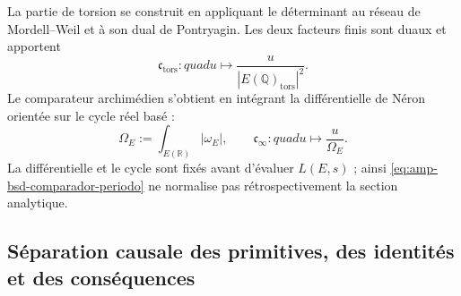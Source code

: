 La partie de torsion se construit en appliquant le déterminant au réseau de
Mordell--Weil et à son dual de Pontryagin. Les deux facteurs finis sont duaux et
apportent
\begin{equation}\label{eq:amp-bsd-comparador-torsion}
 \mathfrak c_{\mathrm{tors}}:quad
 u\longmapsto
 \frac{u}{|E(\mathbb Q)_{\mathrm{tors}}|^2}.
\end{equation}
Le comparateur archimédien s'obtient en intégrant la différentielle de Néron
orientée sur le cycle réel basé :
\begin{equation}\label{eq:amp-bsd-comparador-periodo}
 \Omega_E:=\int_{E(\mathbb R)}|\omega_E|,
 \qquad
 \mathfrak c_\infty:quad u\longmapsto\frac{u}{\Omega_E}.
\end{equation}
La différentielle et le cycle sont fixés avant d'évaluer \(L(E,s)\) ; ainsi
\eqref{eq:amp-bsd-comparador-periodo} ne normalise pas rétrospectivement la
section analytique.

\subsection{Séparation causale des primitives, des identités et des conséquences}
\label{subsec:amp-bsd-separacion-causal}

